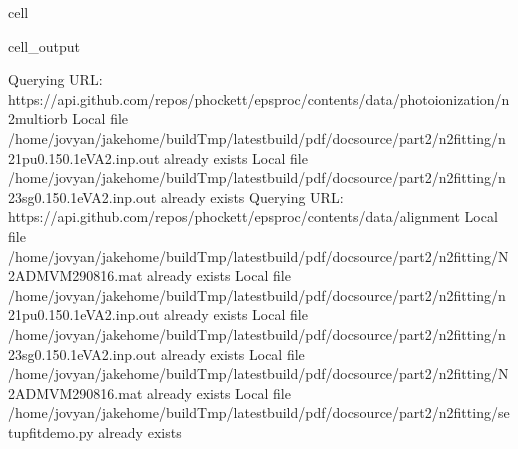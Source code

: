 \documentclass[letterpaper,table,10pt,english]{jupyterBook}
\begin{document}
\begin{sphinxuseclass}{cell}
\begin{sphinxVerbatimOutput}
\begin{sphinxuseclass}{cell_output}
\begin{sphinxVerbatim}[commandchars=\\\{\}]
Querying URL: https://api.github.com/repos/phockett/epsproc/contents/data/photoionization/n2\PYGZus{}multiorb
Local file /home/jovyan/jake\PYGZhy{}home/buildTmp/\PYGZus{}latest\PYGZus{}build/pdf/doc\PYGZhy{}source/part2/n2fitting/n2\PYGZus{}1pu\PYGZus{}0.1\PYGZhy{}50.1eV\PYGZus{}A2.inp.out already exists
Local file /home/jovyan/jake\PYGZhy{}home/buildTmp/\PYGZus{}latest\PYGZus{}build/pdf/doc\PYGZhy{}source/part2/n2fitting/n2\PYGZus{}3sg\PYGZus{}0.1\PYGZhy{}50.1eV\PYGZus{}A2.inp.out already exists
Querying URL: https://api.github.com/repos/phockett/epsproc/contents/data/alignment
Local file /home/jovyan/jake\PYGZhy{}home/buildTmp/\PYGZus{}latest\PYGZus{}build/pdf/doc\PYGZhy{}source/part2/n2fitting/N2\PYGZus{}ADM\PYGZus{}VM\PYGZus{}290816.mat already exists
Local file /home/jovyan/jake\PYGZhy{}home/buildTmp/\PYGZus{}latest\PYGZus{}build/pdf/doc\PYGZhy{}source/part2/n2fitting/n2\PYGZus{}1pu\PYGZus{}0.1\PYGZhy{}50.1eV\PYGZus{}A2.inp.out already exists
Local file /home/jovyan/jake\PYGZhy{}home/buildTmp/\PYGZus{}latest\PYGZus{}build/pdf/doc\PYGZhy{}source/part2/n2fitting/n2\PYGZus{}3sg\PYGZus{}0.1\PYGZhy{}50.1eV\PYGZus{}A2.inp.out already exists
Local file /home/jovyan/jake\PYGZhy{}home/buildTmp/\PYGZus{}latest\PYGZus{}build/pdf/doc\PYGZhy{}source/part2/n2fitting/N2\PYGZus{}ADM\PYGZus{}VM\PYGZus{}290816.mat already exists
Local file /home/jovyan/jake\PYGZhy{}home/buildTmp/\PYGZus{}latest\PYGZus{}build/pdf/doc\PYGZhy{}source/part2/n2fitting/setup\PYGZus{}fit\PYGZus{}demo.py already exists
\end{sphinxVerbatim}

\end{sphinxuseclass}\end{sphinxVerbatimOutput}

\end{sphinxuseclass}
\end{document}
